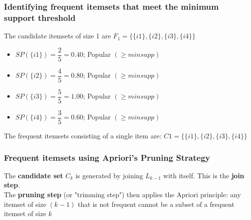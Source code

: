 \subsubsection{Identifying frequent itemsets that meet the minimum support threshold}
The candidate itemsets of size 1 are \(F_1=\{\{i1\},\{i2\},\{i3\},\{i4\}\}\)
\begin{itemize}
\item \(SP(\{i1\})=\dfrac{2}{5}=0.40\); Popular \((\geq minsupp)\)
\item \(SP(\{i2\})=\dfrac{4}{5}=0.80\); Popular  \((\geq minsupp)\)
\item \(SP(\{i3\})=\dfrac{5}{5}=1.00\); Popular  \((\geq minsupp)\)
\item \(SP(\{i4\})=\dfrac{3}{5}=0.60\); Popular  \((\geq minsupp)\)
\end{itemize}
The frequent itemsets consisting of a single item are: \(C1=\{\{i1\},\{i2\},\{i3\},\{i4\}\}\)
\subsubsection{Frequent itemsets using Apriori's Pruning Strategy}
The \textbf{candidate set} \(C_k\) is generated by joining \(L_{k-1}\) with itself. This is the \textbf{join step}.\\
The \textbf{pruning step} (or "trimming step") then applies the Apriori principle: any itemset of size \((k-1)\) that is not frequent cannot be a subset of a frequent itemset of size \(k\)
